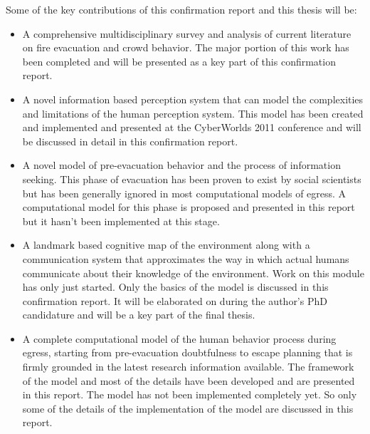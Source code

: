 Some of the key contributions of this confirmation report and this thesis will be:
\begin{itemize}
	\item A comprehensive multidisciplinary survey and analysis of current literature on fire evacuation and crowd behavior. The major portion of this work has been completed and will be presented as a key part of this confirmation report.
	
	\item A novel information based perception system that can model the complexities and limitations of the human perception system. This model has been created and implemented and presented at the CyberWorlds 2011 conference and will be discussed in detail in this confirmation report.
	
	\item A novel model of pre-evacuation behavior and the process of information seeking. This phase of evacuation has been proven to exist by social scientists but has been generally ignored in most computational models of egress. A computational model for this phase is proposed and presented in this report but it hasn't been implemented at this stage.
	
	\item A landmark based cognitive map of the environment along with a communication system that approximates the way in which actual humans communicate about their knowledge of the environment. Work on this module has only just started. Only the basics of the model is discussed in this confirmation report. It will be elaborated on during the author's PhD candidature and will be a key part of the final thesis.
	
	\item A complete computational model of the human behavior process during egress, starting from pre-evacuation doubtfulness to escape planning that is firmly grounded in the latest research information available. The framework of the model and most of the details have been developed and are presented in this report. The model has not been implemented completely yet. So only some of the details of the implementation of the model are discussed in this report. 	
\end{itemize}


